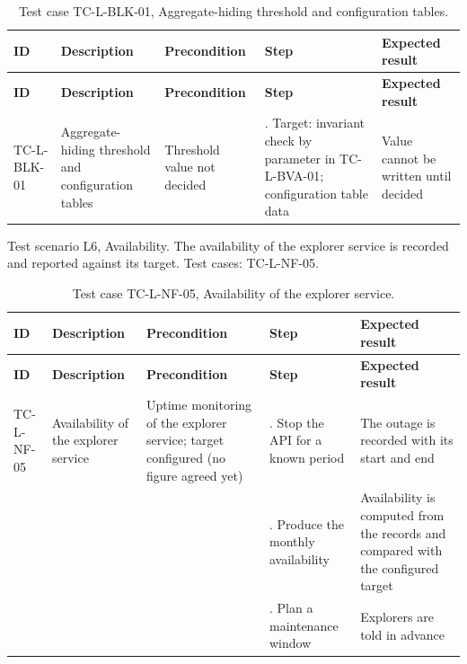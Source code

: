 {\small
\begin{longtable}{|>{\raggedright\arraybackslash}p{}|>{\raggedright\arraybackslash}p{}|>{\raggedright\arraybackslash}p{}|>{\raggedright\arraybackslash}p{}|>{\raggedright\arraybackslash}p{}|}
\caption{Test case TC-L-BLK-01, Aggregate-hiding threshold and configuration tables.} \\
\hline
\textbf{ID} & \textbf{Description} & \textbf{Precondition} & \textbf{Step} & \textbf{Expected result} \\ \hline
\endfirsthead
\hline
\textbf{ID} & \textbf{Description} & \textbf{Precondition} & \textbf{Step} & \textbf{Expected result} \\ \hline
\endhead
TC-L-BLK-01 & Aggregate-hiding threshold and configuration tables & Threshold value not decided & 1. Target: invariant check by parameter in TC-L-BVA-01; configuration table data & Value cannot be written until decided \\ \hline
\end{longtable}
}

Test scenario L6, Availability. The availability of the explorer service is recorded and reported against its target. Test cases: TC-L-NF-05.

{\small
\begin{longtable}{|>{\raggedright\arraybackslash}p{}|>{\raggedright\arraybackslash}p{}|>{\raggedright\arraybackslash}p{}|>{\raggedright\arraybackslash}p{}|>{\raggedright\arraybackslash}p{}|}
\caption{Test case TC-L-NF-05, Availability of the explorer service.} \\
\hline
\textbf{ID} & \textbf{Description} & \textbf{Precondition} & \textbf{Step} & \textbf{Expected result} \\ \hline
\endfirsthead
\hline
\textbf{ID} & \textbf{Description} & \textbf{Precondition} & \textbf{Step} & \textbf{Expected result} \\ \hline
\endhead
TC-L-NF-05 & Availability of the explorer service & Uptime monitoring of the explorer service; target configured (no figure agreed yet) & 1. Stop the API for a known period & The outage is recorded with its start and end \\ \hline
 &  &  & 2. Produce the monthly availability & Availability is computed from the records and compared with the configured target \\ \hline
 &  &  & 3. Plan a maintenance window & Explorers are told in advance \\ \hline
\end{longtable}
}

